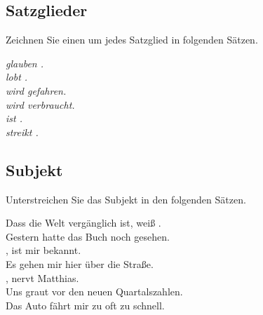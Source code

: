\documentclass[12pt,a4paper,twoside]{article}
\begin{document}
\subsection{\syntaxaufgabe Satzglieder}

Zeichnen Sie einen  um jedes Satzglied in folgenden Sätzen.

\begin{exe}
  \setcounter{xnumi}{0}
  \ex \textit{ glauben   .}\\

  \ex \textit{ lobt .}\\

  \ex \textit{ wird   gefahren.}\\

  \ex \textit{ wird  verbraucht.}\\

  \ex \textit{ ist .}\\

  \ex \textit{ streikt .}
\end{exe}


\subsection{\syntaxaufgabe Subjekt}

Unterstreichen Sie das Subjekt in den folgenden Sätzen.

\begin{exe}
  \setcounter{xnumi}{0}
  \ex Dass die Welt vergänglich ist, weiß .\\

    \ex Gestern hatte  das Buch noch gesehen.\\

    \ex {}, ist mir bekannt.\\

    \ex Es gehen mir hier  über die Straße.\\

    \ex {}, nervt Matthias.\\

    \ex Uns graut vor den neuen Quartalszahlen. \\

  \ex Das Auto fährt mir  zu oft zu schnell.\\

\end{exe}
\end{document}

